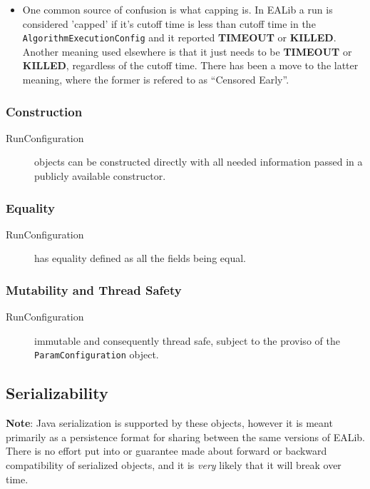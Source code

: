 \documentclass[11pt,letterpaper,oneside]{article}
\begin{document}
\begin{itemize}
\item One common source of confusion is what capping is. In EALib a run is considered 'capped' if it's cutoff time is less than cutoff time in the \texttt{AlgorithmExecutionConfig} and it reported \textbf{TIMEOUT} or \textbf{KILLED}. Another meaning used elsewhere is that it just needs to be \textbf{TIMEOUT} or \textbf{KILLED}, regardless of the cutoff time. There has been a move to the latter meaning, where the former is refered to as ``Censored Early''.
\end{itemize}

\subsubsection{Construction}
\begin{description}
\item[RunConfiguration] objects can be constructed directly with all needed information passed in a publicly available constructor.
\end{description}


\subsubsection{Equality}
\begin{description}
\item[RunConfiguration] has equality defined as all the fields being equal.
\end{description}

\subsubsection{Mutability and Thread Safety}
\begin{description}
\item[RunConfiguration] immutable and consequently thread safe, subject to the proviso of the \texttt{ParamConfiguration} object.
\end{description}

\subsection{Serializability}

\textbf{Note}: Java serialization is supported by these objects, however it is meant primarily as a persistence format for sharing between the same versions of EALib. There is no effort put into or guarantee made about forward or backward compatibility of serialized objects, and it is \emph{very} likely that it will break over time.
\end{document}
